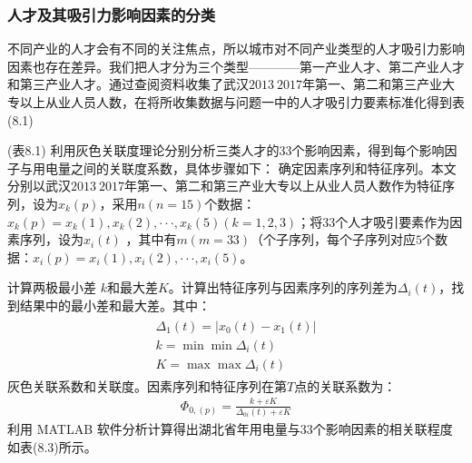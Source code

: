 \documentclass{whutmod}
\begin{document}
	\subsubsection{人才及其吸引力影响因素的分类}
	不同产业的人才会有不同的关注焦点，所以城市对不同产业类型的人才吸引力影响因素也存在差异。我们把人才分为三个类型————第一产业人才、第二产业人才和第三产业人才。通过查阅资料收集了武汉$2013~2017$年第一、第二和第三产业大专以上从业人员人数，在将所收集数据与问题一中的人才吸引力要素标准化得到表(8.1)
	
	(表8.1)
	利用灰色关联度理论分别分析三类人才的$33$个影响因素，得到每个影响因子与用电量之间的关联度系数，具体步骤如下：
	确定因素序列和特征序列。本文分别以武汉$2013~2017$年第一、第二和第三产业大专以上从业人员人数作为特征序列，设为$x_{k}(p)$，采用$n(n=15)$个数据：$x_{k}(p)={x_{k}(1),x_{k}(2),···,x_{k}(5)}(k=1,2,3)$；将$33$个人才吸引要素作为因素序列，设为$x_{i}(t)$ ，其中有$m(m=33)（$个子序列，每个子序列对应$5$个数据：$x_{i}(p)={x_{i}(1),x_{i}(2),···,x_{i}(5)}$。
	
	计算两极最小差 $k$和最大差$K$。计算出特征序列与因素序列的序列差为$\Delta _{i}(t)$，找到结果中的最小差和最大差。其中：
	\begin{gather}
	\begin{array} { l } { \Delta _ { 1 } ( t ) = \left| x _ { 0 } ( t ) - x _ { 1 } ( t ) \right| } \\ { k = \min \min \Delta _ { i } ( t ) } \\ { K = \max \max \Delta _ { i } ( t ) } \end{array}
	\end{gather}
	灰色关联系数和关联度。因素序列和特征序列在第$T$点的关联系数为：
	\begin{gather}
	\Phi _ { 0 , ( p ) } = \frac { k + \varepsilon K } { \Delta _ { 0 i } ( t ) + \varepsilon K }
	\end{gather}
	利用 MATLAB 软件分析计算得出湖北省年用电量与$33$个影响因素的相关联程度如表(8.3)所示。
\end{document}
